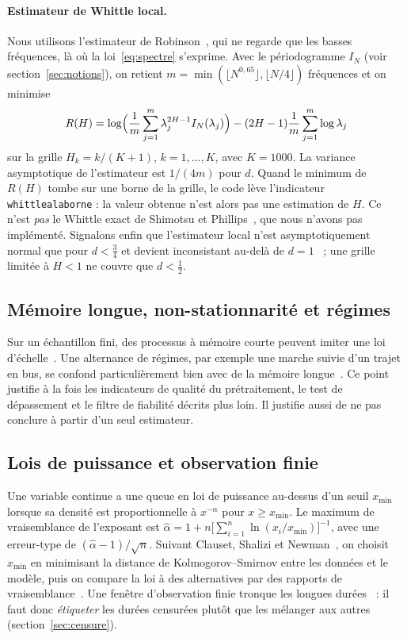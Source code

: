 \documentclass[11pt,a4paper]{article}
\newcommand{\code}[1]{\texttt{#1}}
\renewcommand{\_}{\textunderscore\penalty0\hspace{0pt}}
\begin{document}
\paragraph{Estimateur de Whittle local.}\label{sec:whittle} Nous utilisons l'estimateur de
Robinson~\cite{robinson1995}, qui ne regarde que les basses fréquences, là où la
loi~\eqref{eq:spectre} s'exprime. Avec le périodogramme $I_N$ (voir
section~\ref{sec:notions}), on retient $m=\min(\lfloor N^{0,65}\rfloor,\lfloor N/4\rfloor)$
fréquences et on minimise
\begin{equation}
  R(H)=\log\Bigl(\frac1m\sum_{j=1}^{m}\lambda_j^{2H-1}I_N(\lambda_j)\Bigr)
       -(2H-1)\frac1m\sum_{j=1}^{m}\log\lambda_j
  \label{eq:whittle}
\end{equation}
sur la grille $H_k=k/(K+1)$, $k=1,\dots,K$, avec $K=1000$. La variance asymptotique de
l'estimateur est $1/(4m)$ pour $d$. Quand le minimum de $R(H)$ tombe sur une borne de la
grille, le code lève l'indicateur \code{whittle\_a\_la\_borne} : la valeur obtenue n'est
alors pas une estimation de $H$. Ce n'est \emph{pas} le Whittle exact de Shimotsu et
Phillips~\cite{shimotsu2005}, que nous n'avons pas implémenté. Signalons enfin que
l'estimateur local n'est asymptotiquement normal que pour $d<\tfrac34$ et devient
inconsistant au-delà de $d=1$~\cite{phillips2004} ; une grille limitée à $H<1$ ne couvre que
$d<\tfrac12$.

\subsection{Mémoire longue, non-stationnarité et régimes}

Sur un échantillon fini, des processus à mémoire courte peuvent imiter une loi
d'échelle~\cite{maraun2004}. Une alternance de régimes, par exemple une marche suivie d'un
trajet en bus, se confond particulièrement bien avec de la mémoire
longue~\cite{diebold2001}. Ce point justifie à la fois les indicateurs de qualité du
prétraitement, le test de dépassement et le filtre de fiabilité décrits plus loin. Il
justifie aussi de ne pas conclure à partir d'un seul estimateur.

\subsection{Lois de puissance et observation finie}

Une variable continue a une queue en loi de puissance au-dessus d'un seuil $x_{\min}$
lorsque sa densité est proportionnelle à $x^{-\alpha}$ pour $x\ge x_{\min}$. Le maximum de
vraisemblance de l'exposant est
$\hat\alpha=1+n\bigl[\sum_{i=1}^n\ln(x_i/x_{\min})\bigr]^{-1}$, avec une erreur-type de
$(\hat\alpha-1)/\sqrt n$. Suivant Clauset, Shalizi et Newman~\cite{clauset2009}, on choisit
$x_{\min}$ en minimisant la distance de Kolmogorov--Smirnov entre les données et le modèle,
puis on compare la loi à des alternatives par des rapports de vraisemblance~\cite{vuong1989}.
Une fenêtre d'observation finie tronque les longues durées~\cite{kivela2015} : il faut donc
\emph{étiqueter} les durées censurées plutôt que les mélanger aux autres
(section~\ref{sec:censure}).
\end{document}
